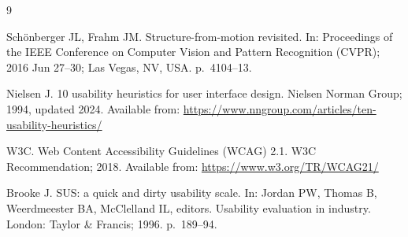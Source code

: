 
\begin{thebibliography}{9}

Sch\"onberger JL, Frahm JM. Structure-from-motion revisited. In: Proceedings of the IEEE Conference
on Computer Vision and Pattern Recognition (CVPR); 2016 Jun 27--30; Las Vegas, NV, USA. p.~4104--13.


Nielsen J. 10 usability heuristics for user interface design. Nielsen Norman Group; 1994, updated
2024. Available from: \url{https://www.nngroup.com/articles/ten-usability-heuristics/}


W3C. Web Content Accessibility Guidelines (WCAG) 2.1. W3C Recommendation; 2018. Available from:
\url{https://www.w3.org/TR/WCAG21/} 


Brooke J. SUS: a quick and dirty usability scale. In: Jordan PW, Thomas B, Weerdmeester BA,
McClelland IL, editors. Usability evaluation in industry. London: Taylor \& Francis; 1996.
p.~189--94.


\end{thebibliography}
